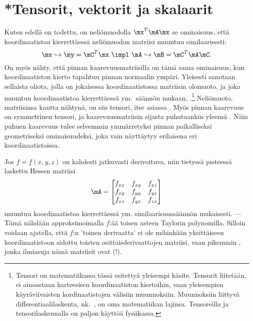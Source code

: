 \section{*Tensorit, vektorit ja skalaarit}  \label{tensorit}
\alku

Kuten edellä on todettu, on neliömuodolla $\mx^T\mA\mx$ se ominaisuus, että koordinaatistoa 
kierrettäessä neliömuodon matriisi muuntuu similaarisesti:
\[
\mx\hookrightarrow\my=\mC^T\mx \ \impl \ \mA\hookrightarrow\mB=\mC^T\mA\mC.
\]
On myös nähty, että pinnan kaarevuusmatriisilla on tämä sama ominaisuus, kun koordinaatiston 
kierto tapahtuu pinnan normaalin ympäri. Yleisesti sanotaan sellaista oliota, jolla on 
jokaisessa koordinaatistossa matriisin olomuoto, ja joka muuntuu koordinaatistoa kierrettäessä
%
ym.\ säännön mukaan, .\footnote[2]{Tensori on matematiikassa tässä esitettyä
yleisempi käsite. Tensorit liitetään, ei ainoastaan karteesisen koordinaatiston kiertoihin,
vaan yleisempien käyräviivaisten kordinaatistojen välisiin muunnoksiin. Muunnoksiin liittyvä
differentiaalilaskenta, nk.\ , on oma matematiikan lajinsa. Tensoreilla ja
tensorilaskennalla on paljon käyttöä fysiikassa.}
Neliömuoto, matriisinsa kautta nähtynä, on siis tensori, itse asiassa .
Myös pinnan kaarevuus on symmetrinen tensori, ja kaarevuusmatriisin sijasta puhutaankin yleensä
%
. Näin puhuen kaarevuus tulee selvemmin ymmärretyksi pinnan
paikalliseksi geometriseksi ominaisuudeksi, joka vain näyttäytyy erilaisena eri
koordinaatistoissa.

Jos $f=f(x,y,z)$ on kahdesti jatkuvasti derivoituva, niin tietyssä pisteessä laskettu Hessen 
matriisi
\[
\mA=\begin{bmatrix} 
    f_{xx} & f_{xy} & f_{xz} \\ f_{xy} & f_{yy} & f_{yz} \\ f_{xz} & f_{yz} & f_{zz} 
    \end{bmatrix}
\]
muuntuu koordinaatistoa kierrettäessä ym. similaarisuussäännön mukaisesti. --- Tämä nähdään 
approksimoimalla $f$:ää toisen asteen Taylorin polynomilla. Silloin voidaan ajatella, että $f$:n
'toinen derivaatta' ei ole mihinkään yksittäiseen koordinaatistoon sidottu toisten 
osittaisderivaattojen matriisi, vaan pikemmin , jonka ilmiasuja nämä matriisit 
ovat (!).

